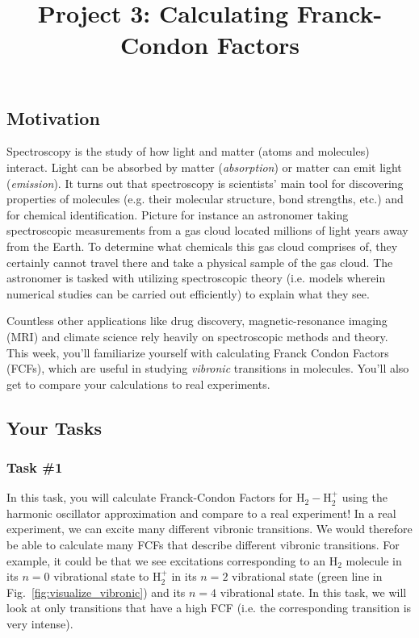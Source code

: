 \documentclass[12pt]{article}
\title{Project 3: Calculating Franck-Condon Factors}
\begin{document}
\maketitle

\thispagestyle{empty}

\subsection*{Motivation}

Spectroscopy is the study of how light and matter (atoms and molecules) interact.
Light can be absorbed by matter (\textit{absorption}) or matter can emit light (\textit{emission}).
It turns out that spectroscopy is scientists' main tool for discovering properties of molecules (e.g. their molecular structure, bond strengths, etc.) and for chemical identification. Picture for instance an astronomer taking spectroscopic measurements from a gas cloud located millions of light years away from the Earth. To determine what chemicals this gas cloud comprises of, they certainly cannot travel there and take a physical sample of the gas cloud. The astronomer is tasked with utilizing spectroscopic theory (i.e. models wherein numerical studies can be carried out efficiently) to explain what they see.

Countless other applications like drug discovery, magnetic-resonance imaging (MRI) and climate science rely heavily on spectroscopic methods and theory. This week, you'll familiarize yourself with calculating Franck Condon Factors (FCFs), which are useful in studying {\it vibronic} transitions in molecules. You'll also get to compare your calculations to real experiments.

\subsection*{Your Tasks}

\subsubsection*{Task \#1}

In this task, you will calculate Franck-Condon Factors for H$_2-$H$_2^+$ using the harmonic oscillator approximation and compare to a real experiment! In a real experiment, we can excite many different vibronic transitions. We would therefore be able to calculate many FCFs that describe different vibronic transitions. For example, it could be that we see excitations corresponding to an H$_2$ molecule in its $n = 0$ vibrational state to H$_2^+$ in its $n = 2$ vibrational state (green line in Fig.~\ref{fig:visualize_vibronic}) and its $n = 4$ vibrational state. In this task, we will look at only transitions that have a high FCF (i.e. the corresponding transition is very intense).
\end{document}
